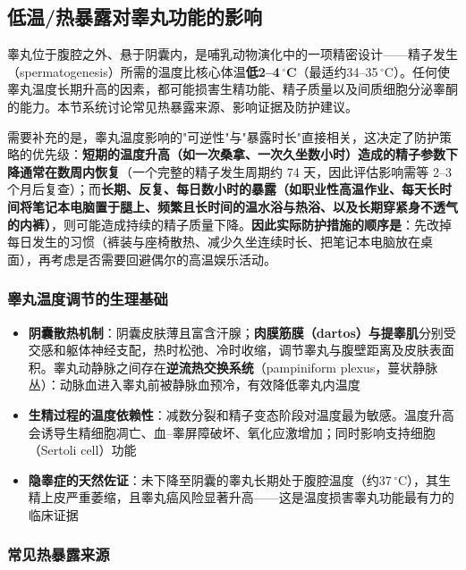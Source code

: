 \subsection{低温/热暴露对睾丸功能的影响}
\label{subsec:testicular_temperature}

睾丸位于腹腔之外、悬于阴囊内，是哺乳动物演化中的一项精密设计——精子发生（spermatogenesis）所需的温度比核心体温\textbf{低2--4\,$^\circ$C}（最适约34--35\,$^\circ$C）。任何使睾丸温度长期升高的因素，都可能损害生精功能、精子质量以及间质细胞分泌睾酮的能力。本节系统讨论常见热暴露来源、影响证据及防护建议。


需要补充的是，睾丸温度影响的"可逆性"与"暴露时长"直接相关，这决定了防护策略的优先级：\textbf{短期的温度升高（如一次桑拿、一次久坐数小时）造成的精子参数下降通常在数周内恢复}（一个完整的精子发生周期约 74 天，因此评估影响需等 2--3 个月后复查）；而\textbf{长期、反复、每日数小时的暴露（如职业性高温作业、每天长时间将笔记本电脑置于腿上、频繁且长时间的温水浴与热浴、以及长期穿紧身不透气的内裤）}，则可能造成持续的精子质量下降。\textbf{因此实际防护措施的顺序是}：先改掉每日发生的习惯（裤装与座椅散热、减少久坐连续时长、把笔记本电脑放在桌面），再考虑是否需要回避偶尔的高温娱乐活动。

\subsubsection{睾丸温度调节的生理基础}

\begin{itemize}[leftmargin=2cm]
	\item \textbf{阴囊散热机制}：阴囊皮肤薄且富含汗腺；\textbf{肉膜筋膜（dartos）与提睾肌}分别受交感和躯体神经支配，热时松弛、冷时收缩，调节睾丸与腹壁距离及皮肤表面积。睾丸动静脉之间存在\textbf{逆流热交换系统}（pampiniform plexus，蔓状静脉丛）：动脉血进入睾丸前被静脉血预冷，有效降低睾丸内温度
	\item \textbf{生精过程的温度依赖性}：减数分裂和精子变态阶段对温度最为敏感。温度升高会诱导生精细胞凋亡、血--睾屏障破坏、氧化应激增加；同时影响支持细胞（Sertoli cell）功能
	\item \textbf{隐睾症的天然佐证}：未下降至阴囊的睾丸长期处于腹腔温度（约37\,$^\circ$C），其生精上皮严重萎缩，且睾丸癌风险显著升高——这是温度损害睾丸功能最有力的临床证据
\end{itemize}

\subsubsection{常见热暴露来源}


